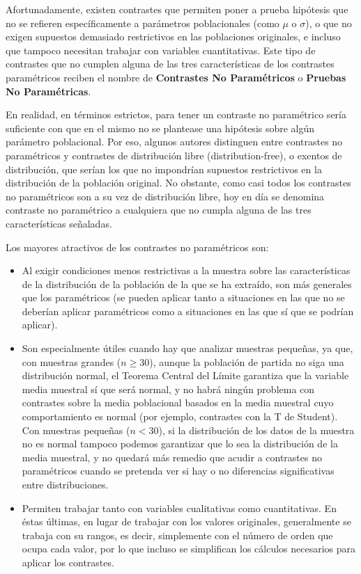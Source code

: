 Afortunadamente, existen contrastes que permiten poner a prueba hipótesis que no se refieren específicamente a parámetros poblacionales
(como $\mu$ o $\sigma$), o que no exigen supuestos demasiado restrictivos en las poblaciones originales, e incluso que tampoco necesitan
trabajar con variables cuantitativas. Este tipo de contrastes que no cumplen alguna de las tres características de los contrastes
paramétricos reciben el nombre de \textbf{Contrastes No Paramétricos} o \textbf{Pruebas No Paramétricas}.

En realidad, en términos estrictos, para tener un contraste no paramétrico sería suficiente con que en el mismo no se plantease una
hipótesis sobre algún parámetro poblacional. Por eso, algunos autores distinguen entre contrastes no paramétricos y contrastes de
distribución libre (distribution-free), o exentos de distribución, que serían los que no impondrían supuestos restrictivos en la
distribución de la población original. No obstante, como casi todos los contrastes no paramétricos son a su vez de distribución libre, hoy
en día se denomina contraste no paramétrico a cualquiera que no cumpla alguna de las tres características señaladas.

Los mayores atractivos de los contrastes no paramétricos son:

\begin{itemize}
\item Al exigir condiciones menos restrictivas a la muestra sobre las características de la distribución de la población de la que se ha
extraído, son más generales que los paramétricos (se pueden aplicar tanto a situaciones en las que no se deberían aplicar paramétricos como
a situaciones en las que sí que se podrían aplicar).

\item Son especialmente útiles cuando hay que analizar muestras pequeñas, ya que, con muestras grandes ($n\geq 30$), aunque la población de
partida no siga una distribución normal, el Teorema Central del Límite garantiza que la variable media muestral sí que será normal, y no
habrá ningún problema con contrastes sobre la media poblacional basados en la media muestral cuyo comportamiento es normal (por ejemplo,
contrastes con la T de Student). Con muestras pequeñas ($n<30$), si la distribución de los datos de la muestra no es normal tampoco podemos
garantizar que lo sea la distribución de la media muestral, y no quedará más remedio que acudir a contrastes no paramétricos cuando se
pretenda ver si hay o no diferencias significativas entre distribuciones.

\item  Permiten trabajar tanto con variables cualitativas como cuantitativas. En éstas últimas, en lugar de trabajar con los valores
originales, generalmente se trabaja con su rangos, es decir, simplemente con el número de orden que ocupa cada valor, por lo que incluso se
simplifican los cálculos necesarios para aplicar los contrastes.
\end{itemize}

